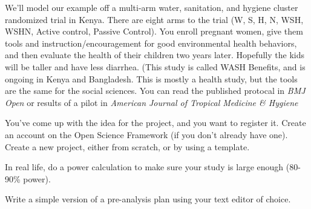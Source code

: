 \documentclass[addpoints,10pt]{exam}
\begin{document}
We'll model our example off a multi-arm water, sanitation, and hygiene cluster randomized trial in Kenya. There are eight arms to the trial (W, S, H, N, WSH, WSHN, Active control, Passive Control). You enroll pregnant women, give them tools and instruction/encouragement for good environmental health behaviors, and then evaluate the health of their children two years later. Hopefully the kids will be taller and have less diarrhea. (This study is called WASH Benefits, and is ongoing in Kenya and Bangladesh. This is mostly a health study, but the tools are the same for the social sciences. You can read the published protocal in \textit{BMJ Open} or results of a pilot in \textit{American Journal of Tropical Medicine \& Hygiene}
\begin{questions}

\question
You've come up with the idea for the project, and you want to register it. Create an account on the Open Science Framework (if you don't already have one). Create a new project, either from scratch, or by using a template.

\question
In real life, do a power calculation to make sure your study is large enough (80-90\% power). 

\question
Write a simple version of a pre-analysis plan using your text editor of choice.
\end{questions}
\end{document}
